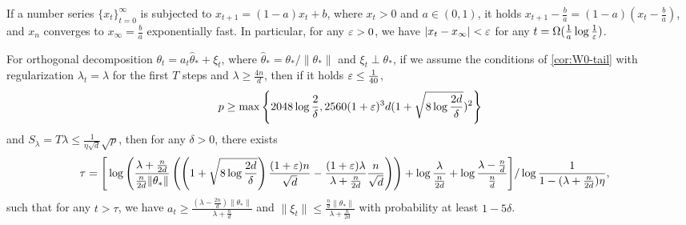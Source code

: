 \begin{lemma}\label{lem:series}
    If a number series $\{x_t\}_{t=0}^\infty$ is subjected to $x_{t+1} = (1-a)x_t + b$, where $x_t > 0$ and $a\in(0,1)$, it holds $x_{t+1} - \frac{b}{a} = (1-a) (x_t - \frac{b}{a})$, and $x_n$ converges to $x_\infty = \frac{b}{a}$ exponentially fast. In particular, for any $\varepsilon >0$, we have $|x_t-x_\infty|<\varepsilon$ for any $t = \Omega(\frac{1}{a}\log\frac{1}{\varepsilon})$.
\end{lemma}

\begin{lemma}\label{lem:series-bound}
   For orthogonal decomposition $\theta_t = a_t \hat\theta_\ast + \xi_t$, where $\hat\theta_\ast = \theta_\ast/\|\theta_\ast\|$ and $\xi_t \perp \theta_\ast$, if we assume the conditions of \cref{cor:W0-tail} with regularization $\lambda_t = \lambda$ for the first $T$ steps and $\lambda \geq \frac{4n}{d}$, then if it holds $\varepsilon\leq \frac{1}{40}$,
   \begin{align*}
       p\geq \max\left\{2048\log\frac{2}{\delta},2560(1+\varepsilon)^3d(1+\sqrt{8\log\frac{2d}{\delta}})^2\right\}
   \end{align*}
   and $S_\lambda = T\lambda\leq \frac{1}{\eta\sqrt{d}}\sqrt{p}$, then for any $\delta>0$, there exists
   \begin{align*}
       \tau & = \Bigg[\log\left(\frac{\lambda+\frac{n}{2d}}{\frac{n}{2d}\|\theta_*\|} \left(\left(1 + \sqrt{8\log\frac{2d}{\delta}}\right)\frac{(1+\varepsilon)n}{\sqrt{d}} - \frac{(1+\varepsilon)\lambda}{\lambda + \frac{n}{2d}}\frac{n}{\sqrt{d}}\right)\right) + \log\frac{\lambda}{\frac{n}{2d}} + \log\frac{\lambda-\frac{n}{d}}{\frac{n}{d}}\Bigg]/\log\frac{1}{1 - (\lambda+\frac{n}{2d})\eta},
   \end{align*}
   such that for any $t>\tau$, we have $a_t\geq \frac{(\lambda - \frac{2n}{d})\|\theta_*\|}{\lambda + \frac{n}{d}}$ and $\|\xi_t\|\leq \frac{\frac{n}{d}\|\theta_*\|}{\lambda + \frac{n}{2d}}$ with probability at least $1-5\delta$.
\end{lemma}

